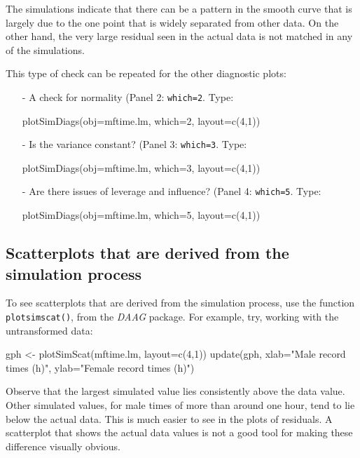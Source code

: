 \documentclass{tufte-book}\usepackage[]{graphicx}\usepackage[]{color}
\newcommand{\txtt}[1]{\texttt{#1}}
\begin{document}
The simulations indicate that there can be a pattern in the smooth
curve that is largely due to the one point that is widely separated
from other data. On the other hand, the very large residual seen in
the actual data is not matched in any of the simulations.

This type of check can be repeated for the other diagnostic plots:
\begin{itemize}
  \item [-] A check for normality (Panel 2: \txtt{which=2}.  Type:
\begin{Schunk}
\begin{Sinput}
plotSimDiags(obj=mftime.lm, which=2, layout=c(4,1))
\end{Sinput}
\end{Schunk}
\item[-] Is the variance constant? (Panel 3: \txtt{which=3}.  Type:
\begin{Schunk}
\begin{Sinput}
plotSimDiags(obj=mftime.lm, which=3, layout=c(4,1))
\end{Sinput}
\end{Schunk}
\item[-]  Are there issues of leverage and influence? (Panel 4:
  \txtt{which=5}.  Type:
\begin{Schunk}
\begin{Sinput}
plotSimDiags(obj=mftime.lm, which=5, layout=c(4,1))
\end{Sinput}
\end{Schunk}
\end{itemize}

\subsection*{Scatterplots that are derived from the simulation process}

To see scatterplots that are derived from the simulation process,
use the function \txtt{plotsimscat()}, from the {\em DAAG} package.
For example, try, working with the untransformed data:
\begin{Schunk}
\begin{Sinput}
gph <- plotSimScat(mftime.lm, layout=c(4,1))
update(gph, xlab="Male record times (h)",
       ylab="Female record times (h)")
\end{Sinput}
\end{Schunk}
Observe that the largest simulated value lies consistently above the
data value. Other simulated values, for male times of more than around
one hour, tend to lie below the actual data.  This is much easier to
see in the plots of residuals.  A scatterplot that shows the actual
data values is not a good tool for making these difference
visually obvious.
\end{document}
